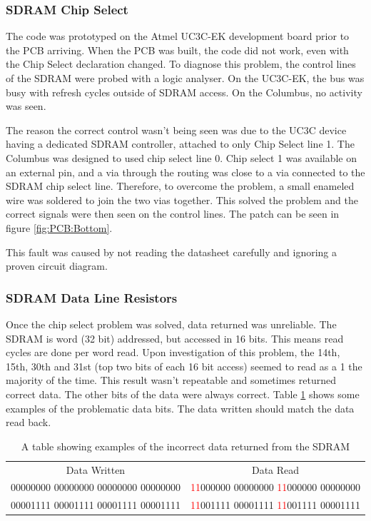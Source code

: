 \subsubsection{SDRAM Chip Select}
The code was prototyped on the Atmel UC3C-EK development board prior to the PCB arriving. When the PCB was built, the code did not work, even with the Chip Select declaration changed. To diagnose this problem, the control lines of the SDRAM were probed with a logic analyser. On the UC3C-EK, the bus was busy with refresh cycles outside of SDRAM access. On the Columbus, no activity was seen. 

The reason the correct control wasn't being seen was due to the UC3C device having a dedicated SDRAM controller, attached to only Chip Select line 1. The Columbus was designed to used chip select line 0. Chip select 1 was available on an external pin, and a via through the routing was close to a via connected to the SDRAM chip select line. Therefore, to overcome the problem, a small enameled wire was soldered to join the two vias together. This solved the problem and the correct signals were then seen on the control lines. The patch can be seen in figure \ref{fig:PCB:Bottom}. 

This fault was caused by not reading the datasheet carefully and ignoring a proven circuit diagram. 

\subsubsection{SDRAM Data Line Resistors}
Once the chip select problem was solved, data returned was unreliable. The SDRAM is word (32 bit) addressed, but accessed in 16 bits. This means read cycles are done per word read. 
Upon investigation of this problem, the 14th, 15th, 30th and 31st (top two bits of each 16 bit access) seemed to read as a 1 the majority of the time. This result wasn't repeatable and sometimes returned correct data. The other bits of the data were always correct. Table \ref{table:SDRAM_Err} shows some examples of the problematic data bits. The data written should match the data read back. 

\begin{table}[!ht]
\caption{A table showing examples of the incorrect data returned from the SDRAM}
\label{table:SDRAM_Err}
\begin{tabular}{c c}
Data Written							&	Data Read \\
00000000 00000000 00000000 00000000		&	\textcolor{red}{11}000000 00000000 \textcolor{red}{11}000000 00000000 \\
00001111 00001111 00001111 00001111		&	\textcolor{red}{11}001111 00001111 \textcolor{red}{11}001111 00001111 \\
\end{tabular}
\end{table}

